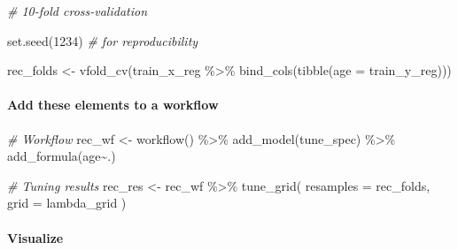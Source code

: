\documentclass[
]{book}
\newenvironment{Shaded}{\begin{snugshade}}{\end{snugshade}}
\newcommand{\AttributeTok}[1]{\textcolor[rgb]{0.77,0.63,0.00}{#1}}
\newcommand{\CommentTok}[1]{\textcolor[rgb]{0.56,0.35,0.01}{\textit{#1}}}
\newcommand{\DecValTok}[1]{\textcolor[rgb]{0.00,0.00,0.81}{#1}}
\newcommand{\FunctionTok}[1]{\textcolor[rgb]{0.00,0.00,0.00}{#1}}
\newcommand{\NormalTok}[1]{#1}
\newcommand{\OtherTok}[1]{\textcolor[rgb]{0.56,0.35,0.01}{#1}}
\newcommand{\SpecialCharTok}[1]{\textcolor[rgb]{0.00,0.00,0.00}{#1}}
\begin{document}
\begin{Shaded}
\begin{Highlighting}[]
\CommentTok{\# 10{-}fold cross{-}validation}

\FunctionTok{set.seed}\NormalTok{(}\DecValTok{1234}\NormalTok{) }\CommentTok{\# for reproducibility }

\NormalTok{rec\_folds }\OtherTok{\textless{}{-}} \FunctionTok{vfold\_cv}\NormalTok{(train\_x\_reg }\SpecialCharTok{\%\textgreater{}\%} \FunctionTok{bind\_cols}\NormalTok{(}\FunctionTok{tibble}\NormalTok{(}\AttributeTok{age =}\NormalTok{ train\_y\_reg)))}
\end{Highlighting}
\end{Shaded}

\hypertarget{add-these-elements-to-a-workflow}{%
\paragraph{Add these elements to a workflow}\label{add-these-elements-to-a-workflow}}

\begin{Shaded}
\begin{Highlighting}[]
\CommentTok{\# Workflow }
\NormalTok{rec\_wf }\OtherTok{\textless{}{-}} \FunctionTok{workflow}\NormalTok{() }\SpecialCharTok{\%\textgreater{}\%}
  \FunctionTok{add\_model}\NormalTok{(tune\_spec) }\SpecialCharTok{\%\textgreater{}\%}
  \FunctionTok{add\_formula}\NormalTok{(age}\SpecialCharTok{\textasciitilde{}}\NormalTok{.)}
\end{Highlighting}
\end{Shaded}

\begin{Shaded}
\begin{Highlighting}[]
\CommentTok{\# Tuning results }
\NormalTok{rec\_res }\OtherTok{\textless{}{-}}\NormalTok{ rec\_wf }\SpecialCharTok{\%\textgreater{}\%}
  \FunctionTok{tune\_grid}\NormalTok{(}
    \AttributeTok{resamples =}\NormalTok{ rec\_folds, }
    \AttributeTok{grid =}\NormalTok{ lambda\_grid}
\NormalTok{  )}
\end{Highlighting}
\end{Shaded}

\hypertarget{visualize}{%
\paragraph{Visualize}\label{visualize}}
\end{document}
